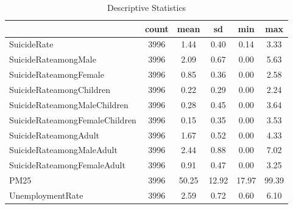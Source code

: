 \begin{table}[htbp]\centering
\def\sym#1{\ifmmode^{#1}\else\(^{#1}\)\fi}
\caption{Descriptive Statistics}
\begin{tabular}{l*{1}{ccccc}}
\hline\hline
            &       count&        mean&          sd&         min&         max\\
\hline
SuicideRate &        3996&        1.44&        0.40&        0.14&        3.33\\
SuicideRateamongMale&        3996&        2.09&        0.67&        0.00&        5.63\\
SuicideRateamongFemale&        3996&        0.85&        0.36&        0.00&        2.58\\
SuicideRateamongChildren&        3996&        0.22&        0.29&        0.00&        2.24\\
SuicideRateamongMaleChildren&        3996&        0.28&        0.45&        0.00&        3.64\\
SuicideRateamongFemaleChildren&        3996&        0.15&        0.35&        0.00&        3.53\\
SuicideRateamongAdult&        3996&        1.67&        0.52&        0.00&        4.33\\
SuicideRateamongMaleAdult&        3996&        2.44&        0.88&        0.00&        7.02\\
SuicideRateamongFemaleAdult&        3996&        0.91&        0.47&        0.00&        3.25\\
PM25        &        3996&       50.25&       12.92&       17.97&       99.39\\
UnemploymentRate&        3996&        2.59&        0.72&        0.60&        6.10\\
\hline\hline
\end{tabular}
\end{table}

